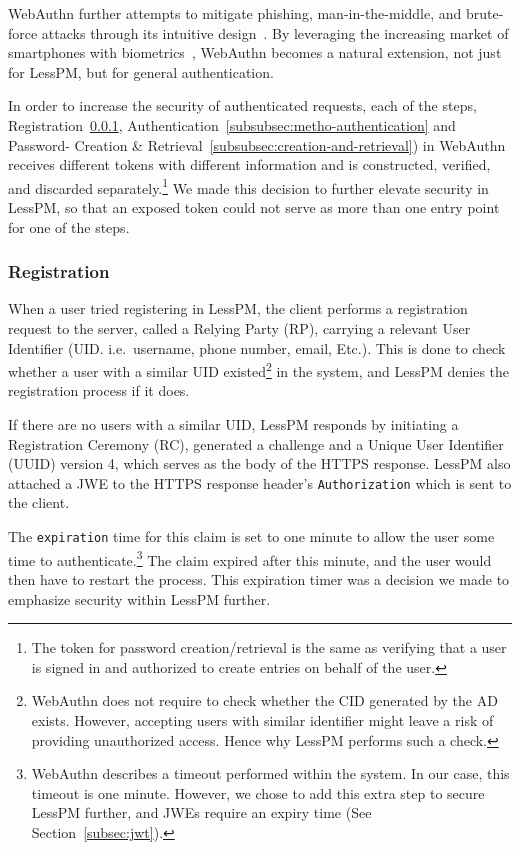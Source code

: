 WebAuthn further attempts to mitigate phishing, man-in-the-middle, and
brute-force attacks through its intuitive design~\cite{webauthn_level_2}.
By leveraging the increasing market of smartphones with
biometrics~\cite{statista-biometric-transactions}, WebAuthn becomes a natural
extension, not just for LessPM, but for general authentication.

In order to increase the security of authenticated requests, each of the
steps, Registration~\ref{subsubsec:metho-registration},
Authentication~\ref{subsubsec:metho-authentication} and
Password- Creation \& Retrieval~\ref{subsubsec:creation-and-retrieval})
in WebAuthn receives different tokens with different information and is
constructed, verified, and discarded separately.\footnote{
  The token for password creation/retrieval is the same as verifying that a user
  is signed in and authorized to create entries on behalf of the user.
}
We made this decision to further elevate security in LessPM, so that an
exposed token could not serve as more than one entry point for one of the steps.

\subsubsection{Registration}\label{subsubsec:metho-registration}
When a user tried registering in LessPM, the client performs a
registration request to the server, called a Relying Party (RP), carrying a
relevant User Identifier (UID. i.e.\ username, phone number, email, Etc.).
This is done to check whether a user with a similar UID existed\footnote{
  WebAuthn does not require to check whether the CID generated by the AD exists.
  However, accepting users with similar identifier might leave a risk of
  providing unauthorized access.
  Hence why LessPM performs such a check.
} in the system, and LessPM denies the registration process if it does.

If there are no users with a similar UID, LessPM responds by initiating a
Registration Ceremony (RC), generated a challenge and a Unique User
Identifier (UUID) version 4, which serves as the body of the HTTPS response.
LessPM also attached a JWE to the HTTPS response header's
\texttt{Authorization} which is sent to the client.

The \texttt{expiration} time for this claim is set to one minute to allow the
user some time to authenticate.\footnote{
  WebAuthn describes a timeout performed within the system. In our case, this
  timeout is one minute.
  However, we chose to add this extra step to secure LessPM further, and
  JWEs require an expiry time (See Section~\ref{subsec:jwt}).
}
The claim expired after this minute, and the user would then have to restart the
process.
This expiration timer was a decision we made to emphasize security within LessPM
further.

